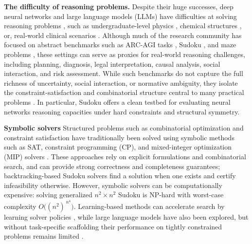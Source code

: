 \documentclass{article}
\theoremstyle{plain}
\theoremstyle{definition}
\theoremstyle{remark}
\renewcommand{\paragraph}[1]{\textbf{#1}\;}
\begin{document}
\paragraph{The difficulty of reasoning problems.}
Despite their huge successes, deep neural networks and large language models (LLMs) 
have difficulties at solving reasoning problems \citep{hazra2024can,malek2025frontier, seely2025sudoku}, 
such as undergraduate-level physics \citep{xu2025ugphysics}, 
chemical structures \citep{mirza2025framework,bartmann2026moleculariq}, or, 
real-world clinical scenarios \citep{kim2025limitations}.
Although much of the research community has focused on abstract benchmarks 
such as ARC-AGI tasks \citep{chollet2019measure, chollet2025arc}, 
Sudoku \citep{seely2025sudoku, long2023large}, and maze problems \citep{wang2025hierarchical}, 
these settings can serve as proxies for real-world reasoning challenges, 
including planning, diagnosis, legal interpretation, causal analysis, 
social interaction, and risk assessment. While such benchmarks do not capture the full richness of uncertainty, 
social interaction, or normative ambiguity, 
they isolate the constraint-satisfaction and 
combinatorial structure central to many practical problems \citep{knuth2015}. 
In particular, Sudoku offers a clean testbed for evaluating neural networks
reasoning capacities under hard constraints and structural symmetry.

\paragraph{Symbolic solvers}
Structured problems such as combinatorial optimization and constraint satisfaction 
have traditionally been solved using symbolic methods such as SAT, 
constraint programming (CP), and mixed-integer optimization (MIP) solvers 
\citep{biere2021sat,zhang2023survey,bengio2021machine,kotary2021end}. 
These approaches rely on explicit formulations and combinatorial search, 
and can provide strong correctness and completeness guarantees; backtracking-based Sudoku solvers find a solution when one exists and certify infeasibility otherwise. 
However, symbolic solvers can be computationally expensive: solving generalized 
$n^2 \times n^2$ Sudoku is NP-hard \citep{yato2003complexity} with worst-case complexity 
$O\big((n^2)^{\,n^4}\big)$. 
Learning-based methods can accelerate search by learning solver policies 
\citep{bengio2021machine}, while large language models have also been explored, 
but without task-specific scaffolding their performance on tightly constrained problems 
remains limited \citep{hazra2024can, malek2025frontier, seely2025sudoku}.
\end{document}
